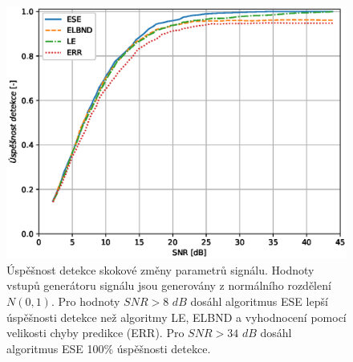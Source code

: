 \begin{figure}[!h]
    \centering
    \includegraphics[scale=0.62]{IMG/mdpi/stepnorm_stats.eps}
    \caption{Úspěšnost detekce skokové změny parametrů signálu. Hodnoty vstupů generátoru signálu jsou generovány z normálního rozdělení $N(0,1)$. Pro hodnoty $SNR > 8$ $dB$ dosáhl algoritmus ESE  lepší úspěšnosti detekce než algoritmy LE, ELBND a vyhodnocení pomocí velikosti chyby predikce (ERR). Pro $SNR > 34$ $dB$ dosáhl algoritmus ESE 100\% úspěšnosti detekce.}
    \label{fig:step_norm_stats}
\end{figure}


